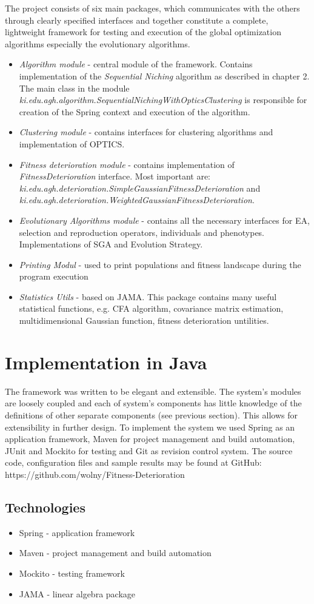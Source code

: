 The project consists of six main packages, which communicates with the
others through clearly specified interfaces and together constitute a
complete, lightweight framework for testing and execution of the global 
optimization algorithms especially the evolutionary algorithms.
\begin{itemize}
  \item \textit{Algorithm module} - central module of the framework. Contains
  implementation of the \textit{Sequential Niching} algorithm as described in
  chapter 2. The main class in the module
  \textit{ki.edu.agh.algorithm.SequentialNichingWithOpticsClustering} is
  responsible for creation of the Spring context and execution of the algorithm. 
  \item \textit{Clustering module} - contains interfaces for clustering
  algorithms and implementation of OPTICS.
  \item \textit{Fitness deterioration module} - contains implementation of
  \textit{FitnessDeterioration} interface. Most important are:
  \textit{ki.edu.agh.deterioration.SimpleGaussianFitnessDeterioration} and 
  \textit{ki.edu.agh.deterioration.WeightedGaussianFitnessDeterioration}.
  \item \textit{Evolutionary Algorithms module} - contains all the necessary
  interfaces for EA, selection and reproduction operators, individuals and
  phenotypes. Implementations of SGA and Evolution Strategy. 
  \item \textit{Printing Modul} - used to print populations and fitness
  landscape during the program execution
  \item \textit{Statistics Utils} - based on JAMA. This package
  contains many useful statistical functions, e.g. CFA algorithm, covariance
  matrix estimation, multidimensional Gaussian function, fitness deterioration
  untilities.
\end{itemize}

\section{Implementation in Java}
\label{sec:impl}

The framework was written to be elegant and extensible. The system's 
modules are loosely coupled and each of system's components has little knowledge of the definitions 
of other separate components (see previous section). This allows for
extensibility in further design. To implement the system we used Spring
as an application framework, Maven for project
management and build automation, JUnit and Mockito
for testing and Git as revision control system. 
The source code, configuration files and sample results may be found at 
GitHub: https://github.com/wolny/Fitness-Deterioration

\subsection{Technologies}
\begin{itemize}
  \item Spring - application framework
  \item Maven - project management and build automation
  \item Mockito - testing framework 
  \item JAMA - linear algebra package
\end{itemize}
